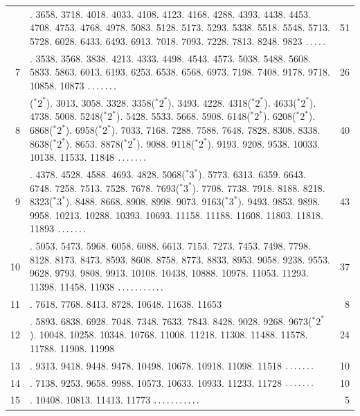 \par\medskip
\begingroup\small
\setlength{\tabcolsep}{4pt}
\begin{longtable}{@{}r>{\raggedright\arraybackslash}p{}r@{}}
 & 3598. 3658. 3718. 4018. 4033. 4108. 4123. 4168. 4288. 4393. 4438. 4453. 4708. 4753. 4768. 4978. 5083. 5128. 5173. 5293. 5338. 5518. 5548. 5713. 5728. 6028. 6433. 6493. 6913. 7018. 7093. 7228. 7813. 8248. 9823 \(\mathinner{.\,.\,.\,.\,.}\) & 51\\
7 & 2008. 3538. 3568. 3838. 4213. 4333. 4498. 4543. 4573. 5038. 5488. 5608. 5833. 5863. 6013. 6193. 6253. 6538. 6568. 6973. 7198. 7408. 9178. 9718. 10858. 10873 \(\mathinner{.\,.\,.\,.\,.\,.\,.}\) & 26\\
8 & 2848(${}^{*}2^{*}$). 3013. 3058. 3328. 3358(${}^{*}2^{*}$). 3493. 4228. 4318(${}^{*}2^{*}$). 4633(${}^{*}2^{*}$). 4738. 5008. 5248(${}^{*}2^{*}$). 5428. 5533. 5668. 5908. 6148(${}^{*}2^{*}$). 6208(${}^{*}2^{*}$). 6868(${}^{*}2^{*}$). 6958(${}^{*}2^{*}$). 7033. 7168. 7288. 7588. 7648. 7828. 8308. 8338. 8638(${}^{*}2^{*}$). 8653. 8878(${}^{*}2^{*}$). 9088. 9118(${}^{*}2^{*}$). 9193. 9208. 9538. 10033. 10138. 11533. 11848 \(\mathinner{.\,.\,.\,.\,.\,.\,.}\) & 40\\
9 & 3688. 4378. 4528. 4588. 4693. 4828. 5068(${}^{*}3^{*}$). 5773. 6313. 6359. 6643. 6748. 7258. 7513. 7528. 7678. 7693(${}^{*}3^{*}$). 7708. 7738. 7918. 8188. 8218. 8323(${}^{*}3^{*}$). 8488. 8668. 8908. 8998. 9073. 9163(${}^{*}3^{*}$). 9493. 9853. 9898. 9958. 10213. 10288. 10393. 10693. 11158. 11188. 11608. 11803. 11818. 11893 \(\mathinner{.\,.\,.\,.\,.\,.\,.}\) & 43\\
10 & 4858. 5053. 5473. 5968. 6058. 6088. 6613. 7153. 7273. 7453. 7498. 7798. 8128. 8173. 8473. 8593. 8608. 8758. 8773. 8833. 8953. 9058. 9238. 9553. 9628. 9793. 9808. 9913. 10108. 10438. 10888. 10978. 11053. 11293. 11398. 11458. 11938 \(\mathinner{.\,.\,.\,.\,.\,.\,.\,.\,.\,.\,.}\) & 37\\
11 & 6298. 7618. 7768. 8413. 8728. 10648. 11638. 11653 & 8\\
12 & 5353. 5893. 6838. 6928. 7048. 7348. 7633. 7843. 8428. 9028. 9268. 9673(${}^{*}2^{*}$). 10048. 10258. 10348. 10768. 11008. 11218. 11308. 11488. 11578. 11788. 11908. 11998 & 24\\
13 & 8938. 9313. 9418. 9448. 9478. 10498. 10678. 10918. 11098. 11518 \(\mathinner{.\,.\,.\,.\,.\,.\,.}\) & 10\\
14 & 6478. 7138. 9253. 9658. 9988. 10573. 10633. 10933. 11233. 11728 \(\mathinner{.\,.\,.\,.\,.\,.\,.}\) & 10\\
15 & 8368. 10408. 10813. 11413. 11773 \(\mathinner{.\,.\,.\,.\,.\,.\,.\,.\,.\,.\,.}\) & 5\\
\end{longtable}\endgroup
